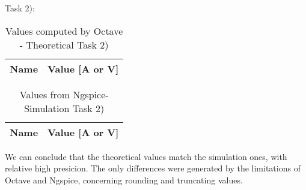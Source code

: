 Task 2):

\begin{table}[ht]
	\centering
	\begin{tabular}{|l|r|}
    		\hline    
    		{\bf Name} & {\bf Value [A or V]} \\ \hline
    		
  	\end{tabular}
  	\caption{Values computed by Octave - Theoretical Task 2)}
 
\label{tab:node}
\end{table}

\begin{table}[ht]
	\centering
	\begin{tabular}{|l|r|}
		\hline    
		{\bf Name} & {\bf Value [A or V]} \\ \hline
    		
	\end{tabular}
	
	\caption{Values from Ngspice- Simulation Task 2)}
    
\label{tab:op1}
\end{table}

We can conclude that the theoretical values match the simulation ones, with relative high presicion. The only
differences were generated by the limitations of Octave and Ngspice, concerning rounding and truncating values.



